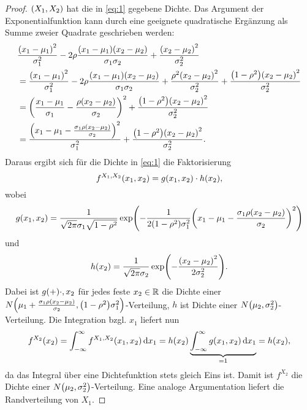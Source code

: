 \documentclass{lecture}
\begin{document}
    \begin{proof}
        \(\parentheses*{X_1, X_2}\) hat die in \eqref{eq:1} gegebene Dichte.
        Das Argument der Exponentialfunktion kann durch eine geeignete quadratische Ergänzung als Summe zweier Quadrate geschrieben werden:
        \begin{align*}
            &\frac{\parentheses*{x_1 - \mu_1}^2}{\sigma_1^2} - 2\rho\frac{\parentheses*{x_1 - \mu_1}\parentheses*{x_2 - \mu_2}}{\sigma_1 \sigma_2} + \frac{\parentheses*{x_2 - \mu_2}^2}{\sigma_2^2}\\
            &= \frac{\parentheses*{x_1 - \mu_1}^2}{\sigma_1^2} - 2\rho\frac{\parentheses*{x_1 - \mu_1}\parentheses*{x_2 - \mu_2}}{\sigma_1 \sigma_2} + \frac{\rho^2\parentheses*{x_2 - \mu_2}^2}{\sigma_2^2} + \frac{\parentheses*{1 - \rho^2}\parentheses*{x_2 - \mu_2}^2}{\sigma_2^2}\\
            &= \parentheses*{\frac{x_1 - \mu_1}{\sigma_1} - \frac{\rho\parentheses*{x_2 - \mu_2}}{\sigma_2}}^2 + \frac{\parentheses*{1 - \rho^2}\parentheses*{x_2 - \mu_2}^2}{\sigma_2^2}\\
            &= \frac{\parentheses*{x_1 - \mu_1 - \frac{\sigma_1 \rho\parentheses*{x_2 - \mu_2}}{\sigma_2}}^2}{\sigma_1^2} + \frac{\parentheses*{1 - \rho^2}\parentheses*{x_2 - \mu_2}^2}{\sigma_2^2}.
        \end{align*}
        Daraus ergibt sich für die Dichte in \eqref{eq:1} die Faktorisierung
        \[
            f^{X_1, X_2}\parentheses*{x_1, x_2} = g\parentheses*{x_1, x_2} \cdot h\parentheses*{x_2},
        \]
        wobei
        \[
            g\parentheses*{x_1, x_2} = \frac{1}{\sqrt{2\pi}\sigma_1\sqrt{1 - \rho^2}}\exp\parentheses*{-\frac{1}{2\parentheses*{1 - \rho^2}\sigma_1^2}\parentheses*{x_1 - \mu_1 - \frac{\sigma_1 \rho\parentheses*{x_2 - \mu_2}}{\sigma_2}}^2}
        \]
        und
        \[
            h\parentheses*{x_2} = \frac{1}{\sqrt{2\pi}\sigma_2}\exp\parentheses*{-\frac{\parentheses*{x_2 - \mu_2}^2}{2\sigma_2^2}}.
        \]
        Dabei ist \(g\parentheses+{\cdot, x_2}\) für jedes feste \(x_2 \in \R\) die Dichte einer \(N\parentheses*{\mu_1 + \frac{\sigma_1 \rho\parentheses*{x_2 - \mu_2}}{\sigma_2}, \parentheses*{1 - \rho^2}\sigma_1^2}\)-Verteilung, \(h\) ist Dichte einer \(N\parentheses*{\mu_2, \sigma_2^2}\)-Verteilung.
        Die Integration bzgl. \(x_1\) liefert nun
        \[
            f^{X_2}\parentheses*{x_2} = \int_{-\infty}^\infty f^{X_1, X_2}\parentheses*{x_1, x_2}\d x_1 = h\parentheses*{x_2}\underbrace{\int_{-\infty}^\infty g\parentheses*{x_1, x_2}\d x_1}_{= 1} = h\parentheses*{x_2},
        \]
        da das Integral über eine Dichtefunktion stets gleich Eins ist.
        Damit ist \(f^{X_2}\) die Dichte einer \(N\parentheses*{\mu_2, \sigma_2^2}\)-Verteilung.
        Eine analoge Argumentation liefert die Randverteilung von \(X_1\).
    \end{proof}
\end{document}
